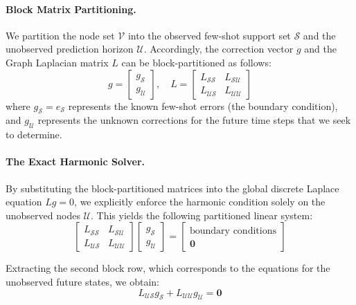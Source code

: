 \documentclass{article}
\begin{document}
\paragraph{Block Matrix Partitioning.} We partition the node set $\mathcal{V}$ into the observed few-shot support set $\mathcal{S}$ and the unobserved prediction horizon $\mathcal{U}$. Accordingly, the correction vector $g$ and the Graph Laplacian matrix $L$ can be block-partitioned as follows:
\begin{equation}
    g = \begin{bmatrix} g_{\mathcal{S}} \\ g_{\mathcal{U}} \end{bmatrix}, \quad L = \begin{bmatrix} L_{\mathcal{SS}} & L_{\mathcal{SU}} \\ L_{\mathcal{US}} & L_{\mathcal{UU}} \end{bmatrix}
\end{equation}
where $g_{\mathcal{S}} = e_{\mathcal{S}}$ represents the known few-shot errors (the boundary condition), and $g_{\mathcal{U}}$ represents the unknown corrections for the future time steps that we seek to determine.

\paragraph{The Exact Harmonic Solver.} By substituting the block-partitioned matrices into the global discrete Laplace equation $L g = 0$, we explicitly enforce the harmonic condition solely on the unobserved nodes $\mathcal{U}$. This yields the following partitioned linear system:
\begin{equation}
    \begin{bmatrix} 
    L_{\mathcal{SS}} & L_{\mathcal{SU}} \\ 
    L_{\mathcal{US}} & L_{\mathcal{UU}} 
    \end{bmatrix} 
    \begin{bmatrix} 
    g_{\mathcal{S}} \\ 
    g_{\mathcal{U}} 
    \end{bmatrix} = 
    \begin{bmatrix} 
    \text{boundary conditions} \\ 
    \mathbf{0} 
    \end{bmatrix}
\end{equation}

Extracting the second block row, which corresponds to the equations for the unobserved future states, we obtain:
\begin{equation}
    L_{\mathcal{US}} g_{\mathcal{S}} + L_{\mathcal{UU}} g_{\mathcal{U}} = \mathbf{0}
\end{equation}
\end{document}

